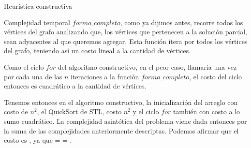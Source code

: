 \begin{section}{Heurística constructiva}
\begin{subsection}{Complejidad temporal}
			$forma\_completo$, como ya dijimos antes, recorre todos los vértices del grafo analizando que, los vértices que pertenecen a la solución parcial, sean adyacentes al que queremos agregar. Esta función itera por todos los vértices del grafo, teniendo así un costo lineal a la cantidad de vértices.
			
			Como el ciclo $for$ del algoritmo constructivo, en el peor caso, llamaría una vez por cada una de las $n$ iteraciones a la función $forma\_completo$, el costo del ciclo entonces es cuadrático a la cantidad de vértices.
			
			Tenemos entonces en el algoritmo constructivo, la inicialización del arreglo con costo de $n^2$, el QuickSort de STL, costo $n^2$ y el ciclo $for$ también con costo a lo sumo cuadrático. La complejidad asintótica del problema viene dada entonces por la suma de las complejidades anteriormente descriptas. Podemos afirmar que el costo es , ya que  =  = .
			
		\end{subsection}

\end{section}

